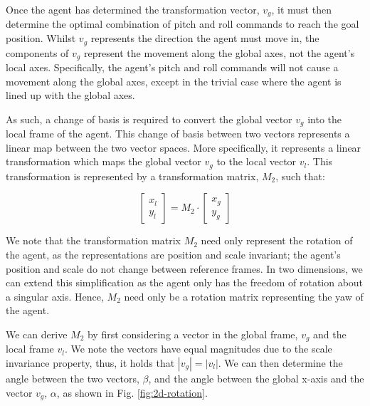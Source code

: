 \documentclass[12pt]{article}
\begin{document}
Once the agent has determined the transformation vector, $v_g$, it must then determine the optimal combination of pitch and roll commands to reach the goal position. Whilst $v_g$ represents the direction the agent must move in, the components of $v_g$ represent the movement along the global axes, not the agent's local axes. Specifically, the agent's pitch and roll commands will not cause a movement along the global axes, except in the trivial case where the agent is lined up with the global axes.

As such, a change of basis is required to convert the global vector $v_g$ into the local frame of the agent. This change of basis between two vectors represents a linear map between the two vector spaces. More specifically, it represents a linear transformation which maps the global vector $v_g$ to the local vector $v_l$. This transformation is represented by a transformation matrix, $M_2$, such that:

\begin{equation}
    \begin{bmatrix}
    x_l \\
    y_l
    \end{bmatrix}
    = M_2 \cdot
    \begin{bmatrix}
    x_g \\
    y_g
    \end{bmatrix}
\label{eq:basis-transformation2}
\end{equation}

We note that the transformation matrix $M_2$ need only represent the rotation of the agent, as the representations are position and scale invariant; the agent's position and scale do not change between reference frames. In two dimensions, we can extend this simplification as the agent only has the freedom of rotation about a singular axis. Hence, $M_2$ need only be a rotation matrix representing the yaw of the agent.

We can derive $M_2$ by first considering a vector in the global frame, $v_g$ and the local frame $v_l$. We note the vectors have equal magnitudes due to the scale invariance property, thus, it holds that $|v_g| = |v_l|$. We can then determine the angle between the two vectors, $\beta$, and the angle between the global x-axis and the vector $v_g$, $\alpha$, as shown in Fig. \ref{fig:2d-rotation}.
\end{document}
